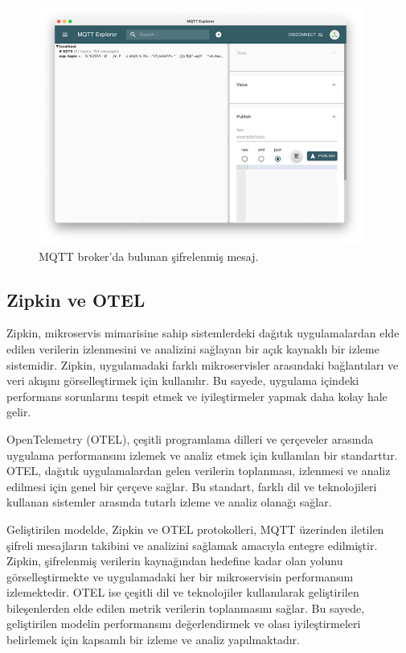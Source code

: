 \documentclass[conference, a4paper]{IEEEtran}
\begin{document}
    
\begin{figure}[H]
    \centering
    \shorthandoff{=}  
    \includegraphics[scale=1.00]{fig2.png}
    \shorthandon{=} 
    \caption{MQTT broker’da bulunan şifrelenmiş mesaj.}
    \label{sekil2}
\end{figure}
	
	\subsection{Zipkin ve OTEL}
    Zipkin, mikroservis mimarisine sahip sistemlerdeki dağıtık uygulamalardan elde edilen verilerin izlenmesini ve analizini sağlayan bir açık kaynaklı bir izleme sistemidir. Zipkin, uygulamadaki farklı mikroservisler arasındaki bağlantıları ve veri akışını görselleştirmek için kullanılır. Bu sayede, uygulama içindeki performans sorunlarını tespit etmek ve iyileştirmeler yapmak daha kolay hale gelir.
    
    OpenTelemetry (OTEL), çeşitli programlama dilleri ve çerçeveler arasında uygulama performansını izlemek ve analiz etmek için kullanılan bir standarttır. OTEL, dağıtık uygulamalardan gelen verilerin toplanması, izlenmesi ve analiz edilmesi için genel bir çerçeve sağlar. Bu standart, farklı dil ve teknolojileri kullanan sistemler arasında tutarlı izleme ve analiz olanağı sağlar.
    
    Geliştirilen modelde, Zipkin ve OTEL protokolleri, MQTT üzerinden iletilen şifreli mesajların takibini ve analizini sağlamak amacıyla entegre edilmiştir. Zipkin, şifrelenmiş verilerin kaynağından hedefine kadar olan yolunu görselleştirmekte ve uygulamadaki her bir mikroservisin performansını izlemektedir. OTEL ise çeşitli dil ve teknolojiler kullanılarak geliştirilen bileşenlerden elde edilen metrik verilerin toplanmasını sağlar. Bu sayede, geliştirilen modelin performansını değerlendirmek ve olası iyileştirmeleri belirlemek için kapsamlı bir izleme ve analiz yapılmaktadır.
\end{document}
